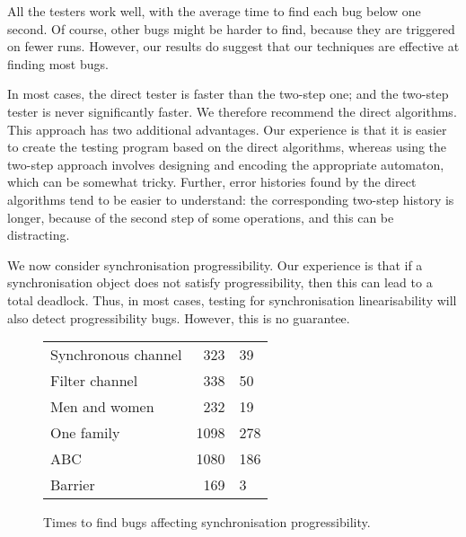 
All the testers work well, with the average time to find each bug below one
second.  Of course, other bugs might be harder to find, because they are
triggered on fewer runs.  However, our results do suggest that our techniques
are effective at finding most bugs.

In most cases, the direct tester is faster than the two-step one; and the
two-step tester is never significantly faster.  We therefore recommend the
direct algorithms.  This approach has two additional advantages.  Our
experience is that it is easier to create the testing program based on the
direct algorithms, whereas using the two-step approach involves designing and
encoding the appropriate automaton, which can be somewhat tricky.  Further,
error histories found by the direct algorithms tend to be easier to
understand: the corresponding two-step history is longer, because of the
second step of some operations, and this can be distracting.


We now consider synchronisation progressibility.  Our experience is that if a
synchronisation object does not satisfy progressibility, then this can lead to
a total deadlock.  Thus, in most cases, testing for synchronisation
linearisability will also detect progressibility bugs.  However, this is no
guarantee.    



\begin{figure}
\begin{center}
\begin{tabular}{lr@{$\,\pm\,$}l}
Synchronous channel  &	323	 & 39 \\
Filter channel  &	338	 & 50 \\
Men and women  	&       232	 & 19 \\
One family  	&      1098	 & 278 \\
ABC  	&              1080	 & 186 \\
Barrier  	&       169	 & 3
\end{tabular}
\end{center}
\caption{Times to find bugs affecting synchronisation progressibility.}
\label{fig:progressBugFindingExperiment}
\end{figure}

